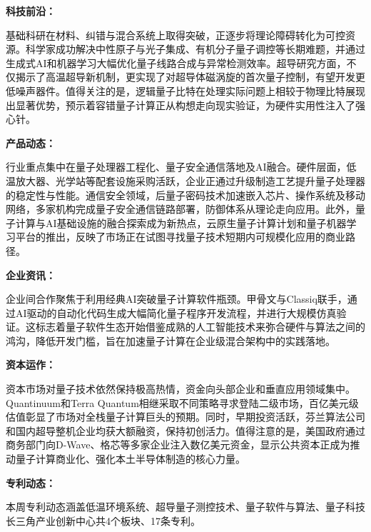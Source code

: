 \documentclass[12pt,a4paper]{ctexart}
\begin{document}
\textbf{ 科技前沿：}

基础科研在材料、纠错与混合系统上取得突破，正逐步将理论障碍转化为可控资源。科学家成功解决中性原子与光子集成、有机分子量子调控等长期难题，并通过生成式AI和机器学习大幅优化量子线路合成与异常检测效率。超导研究方面，不仅揭示了高温超导新机制，更实现了对超导体磁涡旋的首次量子控制，有望开发更低噪声器件。值得关注的是，逻辑量子比特在处理实际问题上相较于物理比特展现出显著优势，预示着容错量子计算正从构想走向现实验证，为硬件实用性注入了强心针。


\textbf{ 产品动态：}

行业重点集中在量子处理器工程化、量子安全通信落地及AI融合。硬件层面，低温放大器、光学站等配套设施采购活跃，企业正通过升级制造工艺提升量子处理器的稳定性与性能。通信安全领域，后量子密码技术加速嵌入芯片、操作系统及移动网络，多家机构完成量子安全通信链路部署，防御体系从理论走向应用。此外，量子计算与AI基础设施的融合探索成为新热点，云原生量子计算计划和量子机器学习平台的推出，反映了市场正在试图寻找量子技术短期内可规模化应用的商业路径。


\textbf{ 企业资讯：}

企业间合作聚焦于利用经典AI突破量子计算软件瓶颈。甲骨文与Classiq联手，通过AI驱动的自动化代码生成大幅简化量子程序开发流程，并进行大规模仿真验证。这标志着量子软件生态开始借鉴成熟的人工智能技术来弥合硬件与算法之间的鸿沟，降低开发门槛，旨在加速量子计算在企业级混合架构中的实践落地。


\textbf{ 资本运作：}

资本市场对量子技术依然保持极高热情，资金向头部企业和垂直应用领域集中。Quantinuum和Terra Quantum相继采取不同策略寻求登陆二级市场，百亿美元级估值彰显了市场对全栈量子计算巨头的预期。同时，早期投资活跃，芬兰算法公司和国内超导整机企业均获大额融资，保持初创活力。值得注意的是，美国政府通过商务部门向D-Wave、格芯等多家企业注入数亿美元资金，显示公共资本正成为推动量子计算商业化、强化本土半导体制造的核心力量。




\textbf{ 专利动态：}

本周专利动态涵盖低温环境系统、超导量子测控技术、量子软件与算法、量子科技长三角产业创新中心共4个板块、17条专利。
\end{document}
